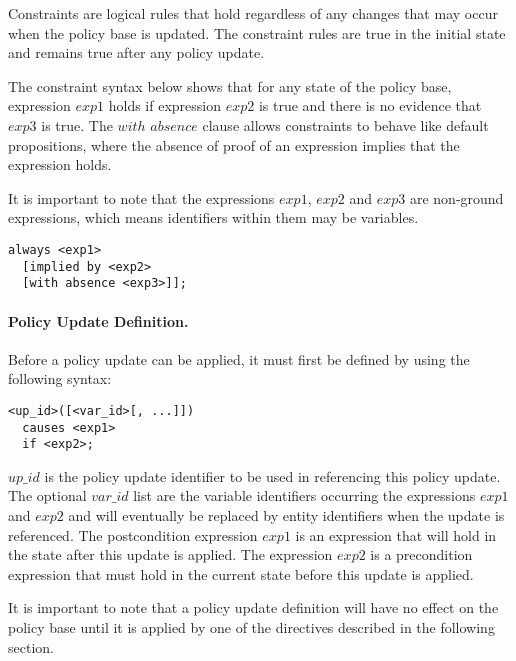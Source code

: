 \documentclass{llncs}
\begin{document}
          Constraints are logical rules that hold regardless of any changes
          that may occur when the policy base is updated. The constraint rules
          are true in the initial state and remains true after any policy
          update.

          The constraint syntax below shows that for any state of the policy
          base, expression $exp1$ holds if expression $exp2$ is true and there
          is no evidence that $exp3$ is true. The $with$ $absence$ clause
          allows constraints to behave like default propositions, where the
          absence of proof of an expression implies that the expression holds.

          It is important to note that the expressions $exp1$, $exp2$ and
          $exp3$ are non-ground expressions, which means identifiers within
          them may be variables.

          \begin{verbatim}always <exp1>
  [implied by <exp2>
  [with absence <exp3>]];\end{verbatim}

        \paragraph{Policy Update Definition.}

          Before a policy update can be applied, it must first be defined by
          using the following syntax:

          \begin{verbatim}<up_id>([<var_id>[, ...]])
  causes <exp1>
  if <exp2>;\end{verbatim}

          $up\_id$ is the policy update identifier to be used in referencing
          this policy update. The optional $var\_id$ list are the variable
          identifiers occurring the expressions $exp1$ and $exp2$ and will
          eventually be replaced by entity identifiers when the update is
          referenced. The postcondition expression $exp1$ is an expression that
          will hold in the state after this update is applied. The expression
          $exp2$ is a precondition expression that must hold in the current
          state before this update is applied.

          It is important to note that a policy update definition will have no
          effect on the policy base until it is applied by one of the
          directives described in the following section.
\end{document}
